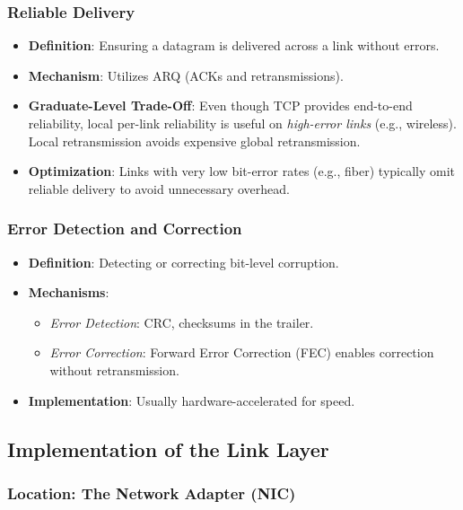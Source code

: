 \documentclass[12pt]{article}
\begin{document}
\subsubsection{Reliable Delivery}

\begin{itemize}
    \item \textbf{Definition}: Ensuring a datagram is delivered across a link without errors.
    \item \textbf{Mechanism}: Utilizes ARQ (ACKs and retransmissions).
    \item \textbf{Graduate-Level Trade-Off}:
          Even though TCP provides end-to-end reliability, local per-link reliability is useful on \emph{high-error links} (e.g., wireless). Local retransmission avoids expensive global retransmission.
    \item \textbf{Optimization}: Links with very low bit-error rates (e.g., fiber) typically omit reliable delivery to avoid unnecessary overhead.
\end{itemize}

\subsubsection{Error Detection and Correction}

\begin{itemize}
    \item \textbf{Definition}: Detecting or correcting bit-level corruption.
    \item \textbf{Mechanisms}:
          \begin{itemize}
              \item \emph{Error Detection}: CRC, checksums in the trailer.
              \item \emph{Error Correction}: Forward Error Correction (FEC) enables correction without retransmission.
          \end{itemize}
    \item \textbf{Implementation}: Usually hardware-accelerated for speed.
\end{itemize}

\subsection{Implementation of the Link Layer}

\subsubsection{Location: The Network Adapter (NIC)}
\end{document}
